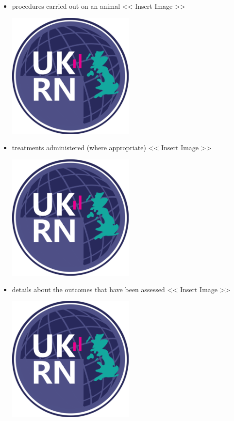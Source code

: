 \documentclass[]{book}
\providecommand{\tightlist}{%
  \setlength{\itemsep}{0pt}\setlength{\parskip}{0pt}}
\begin{document}
\begin{itemize}
\tightlist
\item
  procedures carried out on an animal \textless{}\textless{} Insert
  Image \textgreater{}\textgreater{}

  \includegraphics[width=0.50000\textwidth,height=0.50000\textwidth]{figs/evidence-triangle.png}
\item
  treatments administered (where appropriate) \textless{}\textless{}
  Insert Image \textgreater{}\textgreater{}

  \includegraphics[width=0.50000\textwidth,height=0.50000\textwidth]{figs/evidence-triangle.png}
\item
  details about the outcomes that have been assessed
  \textless{}\textless{} Insert Image \textgreater{}\textgreater{}

  \includegraphics[width=0.50000\textwidth,height=0.50000\textwidth]{figs/evidence-triangle.png}
\end{itemize}
\end{document}
